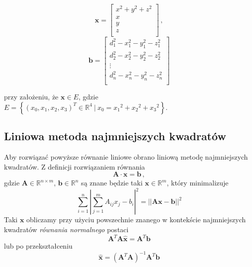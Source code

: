 \begin{equation}
    \mathbf{x} =
    \left[
        \begin{matrix}
            x^2 + y^2 + z^2\\
            x\\
            y\\
            z\\
        \end{matrix}
    \right]\,,
\end{equation}
\begin{equation}
    \mathbf{b} =
    \left[
        \begin{matrix}
            d_1^2 - x_1^2 - y_1^2 - z_1^2\\
            d_2^2 - x_2^2 - y_2^2 - z_2^2\\
            \vdots\\
            d_n^2 - x_n^2 - y_n^2 - z_n^2\\
        \end{matrix}
    \right]
\end{equation}

przy założeniu, że $\mathbf{x} \in E$, gdzie $E = \left\{(x_0, x_1, x_2, x_3)^T \in {\mathbb{R}}^4\ |\ x_0 = {x_1}^2 + {x_2}^2 + {x_3}^2\right\}$.

\subsection{Liniowa metoda najmniejszych kwadratów}

Aby rozwiązać powyższe równanie liniowe obrano liniową metodę najmniejszych kwadratów. Z definicji rozwiązaniem równania
\begin{equation}
    \mathbf{A} \cdot \mathbf{x} = \mathbf{b}\,,
\end{equation}
gdzie $\mathbf{A} \in \mathbb{R}^{n\times m}$, $\mathbf{b} \in \mathbb{R}^n$ są znane będzie taki $\mathbf{x} \in \mathbb{R}^m$, który minimalizuje
\begin{equation}
    \sum_{i=1}^{n}{\left|\sum_{j=1}^{m}{A_{ij}x_j} - b_i\right|^2} = ||\mathbf{A}\mathbf{x} - \mathbf{b}||^2
\end{equation}
Taki $\mathbf{x}$ obliczamy przy użyciu powszechnie znanego w kontekście najmniejszych kwadratów \textit{równania normalnego} postaci
\begin{equation}
    \mathbf{A}^T\mathbf{A}\hat{\mathbf{x}} = \mathbf{A}^T\mathbf{b}
\end{equation}
lub po przekształceniu
\begin{equation}\label{eq:lls}
    \hat{\mathbf{x}} = {\left(\mathbf{A}^T\mathbf{A}\right)}^{-1}\mathbf{A}^T\mathbf{b}
\end{equation}

